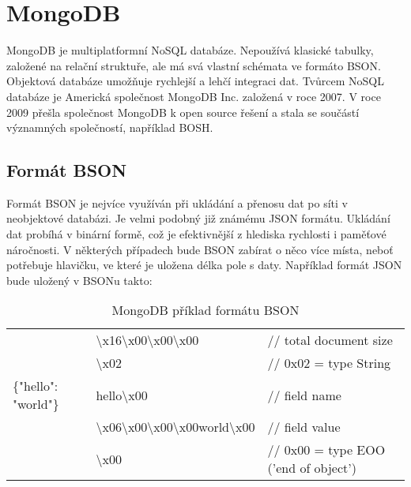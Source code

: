 \section {MongoDB}
\par MongoDB je multiplatformní NoSQL databáze. Nepoužívá klasické tabulky, založené na relační struktuře, ale má svá vlastní schémata ve formáto BSON. Objektová databáze umožňuje rychlejší a lehčí integraci dat. Tvůrcem NoSQL databáze je Americká společnost MongoDB Inc. založená v roce 2007. V roce 2009 přešla společnost MongoDB k open source řešení a stala se součástí významných společností, například BOSH.
\subsection {Formát BSON}
\par Formát BSON je nejvíce využíván při ukládání a přenosu dat po síti v neobjektové databázi. Je velmi podobný již známému JSON formátu. Ukládání dat probíhá v binární formě, což je efektivnější z hlediska rychlosti i paměťové náročnosti. V některých případech bude BSON zabírat o něco více místa, neboť potřebuje hlavičku, ve které je uložena délka pole s daty.
Například formát JSON bude uložený v BSONu takto: 

\begin{table}[h!]
\centering
\caption[MongoDB příklad formátu BSON]{MongoDB příklad formátu BSON}\label{tab:bson}
\begin{tabular}{ l l l }
 						& \textbackslash{x}16\textbackslash{x}00\textbackslash{x}00\textbackslash{x}00 								&// total document size \\
 						& \textbackslash{x}02 																						&// 0x02 = type String\\
\{"hello": "world"\} 	& hello\textbackslash{x}00 																					&// field name\\
 						& \textbackslash{x}06\textbackslash{x}00\textbackslash{x}00\textbackslash{x}00world\textbackslash{x}00 		&// field value\\
 						& \textbackslash{x}00 																						&// 0x00 = type EOO ('end of object')\\
\end{tabular}
\end{table}



                   
  
  
